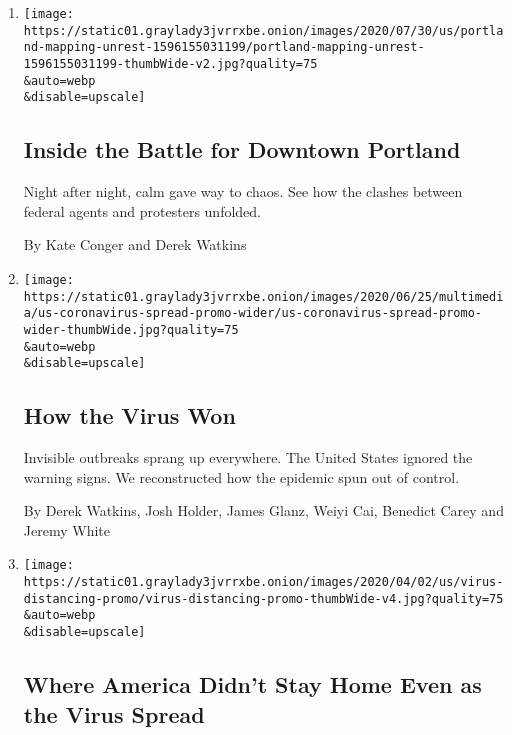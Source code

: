 \begin{enumerate}
\def\labelenumi{\arabic{enumi}.}
\item
  \href{/interactive/2020/07/31/us/portland-protests-map-photos.html}{}

  \texttt{[image: https://static01.graylady3jvrrxbe.onion/images/2020/07/30/us/portland-mapping-unrest-1596155031199/portland-mapping-unrest-1596155031199-thumbWide-v2.jpg?quality=75\\\&auto=webp\\\&disable=upscale]}

  \hypertarget{inside-the-battle-for-downtown-portland}{%
  \subsection{Inside the Battle for Downtown
  Portland}\label{inside-the-battle-for-downtown-portland}}

  Night after night, calm gave way to chaos. See how the clashes between
  federal agents and protesters unfolded.

  By Kate Conger and Derek Watkins
\item
  \href{/interactive/2020/us/coronavirus-spread.html}{}

  \texttt{[image: https://static01.graylady3jvrrxbe.onion/images/2020/06/25/multimedia/us-coronavirus-spread-promo-wider/us-coronavirus-spread-promo-wider-thumbWide.jpg?quality=75\\\&auto=webp\\\&disable=upscale]}

  \hypertarget{how-the-virus-won}{%
  \subsection{How the Virus Won}\label{how-the-virus-won}}

  Invisible outbreaks sprang up everywhere. The United States ignored
  the warning signs. We reconstructed how the epidemic spun out of
  control.

  By Derek Watkins, Josh Holder, James Glanz, Weiyi Cai, Benedict Carey
  and Jeremy White
\item
  \href{/interactive/2020/04/02/us/coronavirus-social-distancing.html}{}

  \texttt{[image: https://static01.graylady3jvrrxbe.onion/images/2020/04/02/us/virus-distancing-promo/virus-distancing-promo-thumbWide-v4.jpg?quality=75\\\&auto=webp\\\&disable=upscale]}

  \hypertarget{where-america-didnt-stay-home-even-as-the-virus-spread}{%
  \subsection{Where America Didn't Stay Home Even as the Virus
  Spread}\label{where-america-didnt-stay-home-even-as-the-virus-spread}}


\end{enumerate}
